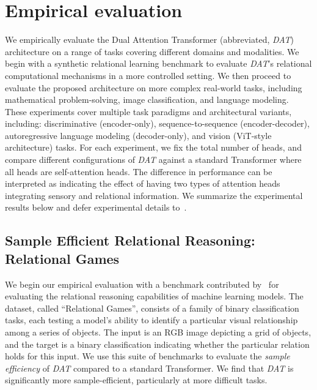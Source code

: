 \section{Empirical evaluation}\label{sec:experiments}

We empirically evaluate the Dual Attention Transformer (abbreviated, \textit{DAT}) architecture on a range of tasks covering different domains and modalities. We begin with a synthetic relational learning benchmark to evaluate \textit{DAT}'s relational computational mechanisms in a more controlled setting. We then proceed to evaluate the proposed architecture on more complex real-world tasks, including mathematical problem-solving, image classification, and language modeling. These experiments cover multiple task paradigms and architectural variants, including: discriminative (encoder-only), sequence-to-sequence (encoder-decoder), autoregressive language modeling (decoder-only), and vision (ViT-style architecture) tasks. 
For each experiment, we fix the total number of heads, and compare different configurations of \textit{DAT} against a standard Transformer where all heads are self-attention heads. The difference in performance can be interpreted as indicating the effect of having two types of attention heads integrating sensory and relational information.
We summarize the experimental results below and defer experimental details to~.

\subsection{Sample Efficient Relational Reasoning: Relational Games}\label{ssec:relgames}

We begin our empirical evaluation with a benchmark contributed by~\citet{shanahanExplicitlyRelationalNeurala} for evaluating the relational reasoning capabilities of machine learning models. The dataset, called ``Relational Games'', consists of a family of binary classification tasks, each testing a model's ability to identify a particular visual relationship among a series of objects. The input is an RGB image depicting a grid of objects, and the target is a binary classification indicating whether the particular relation holds for this input. We use this suite of benchmarks to evaluate the \textit{sample efficiency} of \textit{DAT} compared to a standard Transformer. We find that \textit{DAT} is significantly more sample-efficient, particularly at more difficult tasks. %

